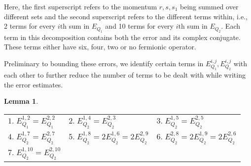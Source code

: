 \documentclass[sn-mathphys, Numbered ,a4paper]{sn-jnl}%
\theoremstyle{plain}
\newtheorem{lemma}[theorem]{Lemma}
\theoremstyle{definition}
\theoremstyle{remark}
\theoremstyle{plain}
\theoremstyle{definition}
\theoremstyle{remark}
\begin{document}
Here, the first superscript refers to the momentum $r,s,s_1$ being summed over different sets and the second superscript refers to the different terms within, i.e., 2 terms for every $i\mathrm{th}$ sum in $E_{Q_1}$ and 10 terms for every $i\mathrm{th}$ sum in $E_{Q_2}$. Each term in this decomposition contains both the error and its complex conjugate. These terms either have six, four, two or no fermionic operator.

Preliminary to bounding these errors, we identify certain terms in $E_{Q_1}^{i,j}, E_{Q_2}^{i,j}$ with each other to further reduce the number of terms to be dealt with while writing the error estimates.

\begin{lemma}
{\renewcommand{\arraystretch}{1.5}
	\begin{tabular}[t]{lll}
		 $\mathit{1.}\; E_{Q_1}^{1,2} = E_{Q_1}^{2,2}$\quad\quad& 
		 $\mathit{2.}\; E_{Q_2}^{1,4} = E_{Q_2}^{2,3}$\quad\quad&
		 $\mathit{3.}\; E_{Q_2}^{1,5} = E_{Q_2}^{2,5}$ \quad\quad\\
		 $\mathit{4.}\; E_{Q_2}^{1,7} = E_{Q_2}^{2,7}$\quad\quad&
		 $\mathit{5.}\; E_{Q_2}^{1,8} = 2E_{Q_2}^{1,6} =  2E_{Q_2}^{2,9}$\quad\quad&
		 $\mathit{6.}\; E_{Q_2}^{2,8} = 2E_{Q_2}^{1,9} = 2E_{Q_2}^{2,6}$\quad\quad\\
		 $\mathit{7.}\; E_{Q_2}^{1,10} = E_{Q_2}^{2,10}$\quad\quad
		 
\end{tabular}}
\end{lemma}	 
\end{document}
